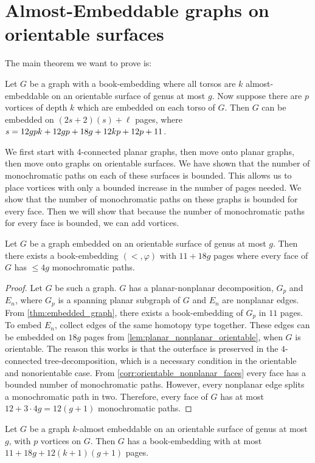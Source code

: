 \section{Almost-Embeddable graphs on orientable surfaces}

The main theorem we want to prove is:
\begin{theorem}\label{thm:orientablevortices}
	Let $G$ be a graph with a book-embedding where all torsos are $k$ almost-embeddable on an orientable surface of genus at most $g$. Now suppose there are $p$ vortices of depth $k$ which are embedded on each torso of $G$. Then $G$ can be embedded on $(2s + 2)(s) + \ell$ pages, where $s = 12gpk + 12gp + 18g + 12kp + 12p + 11$. 
\end{theorem}
We first start with 4-connected planar graphs, then move onto planar graphs, then move onto graphs on orientable surfaces. We have shown that the number of monochromatic paths on each of these surfaces is bounded. This allows us to place vortices with only a bounded increase in the number of pages needed. We show that the number of monochromatic paths on these graphs is bounded for every face. Then we will show that because the number of monochromatic paths for every face is bounded, we can add vortices.

\begin{lemma}\label{lem:orientablesurfaces_monochromatic_edges}
	Let $G$ be a graph embedded on an orientable surface of genus at most $g$. Then there exists a book-embedding $(<, \varphi)$ with $11 + 18g$ pages where every face of $G$ has $ \leq 4g$ monochromatic paths.
\end{lemma}
\begin{proof}
	Let $G$ be such a graph. $G$ has a planar-nonplanar decomposition, $G_p$ and $E_n$, where $G_p$ is a spanning planar subgraph of $G$ and $E_n$ are nonplanar edges. From \cref{thm:embedded_graph}, there exists a book-embedding of $G_p$ in $11$ pages. To embed $E_n$, collect edges of the same homotopy type together. These edges can be embedded on $18g$ pages from \cref{lem:planar_nonplanar_orientable}, when $G$ is orientable. The reason this works is that the outerface is preserved in the $4$-connected tree-decomposition, which is a necessary condition in the orientable and nonorientable case.
	From \cref{corr:orientable_nonplanar_faces} every face has a bounded number of monochromatic paths. However, every nonplanar edge splits a monochromatic path in two. Therefore, every face of $G$ has at most $12 + 3 \cdot 4g = 12(g + 1)$ monochromatic paths.
\end{proof}
\begin{lemma}\label{lem:orientablesurfaces_almostembeddable}
	Let $G$ be a graph $k$-almost embeddable on an orientable surface of genus at most $g$, with $p$ vortices on $G$. Then $G$ has a book-embedding with at most $11 + 18g + 12(k + 1)(g + 1)$ pages.
\end{lemma}

